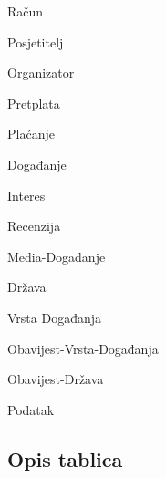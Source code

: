 	\begin{packed_item}
		
		\item Račun
		\item Posjetitelj
		\item Organizator
		\item Pretplata
		\item Plaćanje
		\item Događanje
		\item Interes
		\item Recenzija
		\item Media-Događanje
		\item Država
		\item Vrsta Događanja
		\item Obavijest-Vrsta-Događanja
		\item Obavijest-Država
		\item Podatak
	\end{packed_item}
		
		
			\subsection{Opis tablica}
					

			
